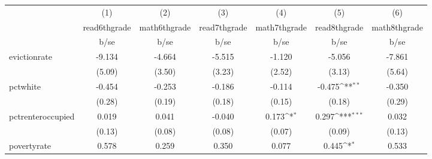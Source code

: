 {
\def\sym#1{\ifmmode^{#1}\else\(^{#1}\)\fi}
\begin{tabular}{l*{6}{c}}
\hline\hline
            &\multicolumn{1}{c}{(1)}           &\multicolumn{1}{c}{(2)}           &\multicolumn{1}{c}{(3)}           &\multicolumn{1}{c}{(4)}           &\multicolumn{1}{c}{(5)}           &\multicolumn{1}{c}{(6)}           \\
            &\multicolumn{1}{c}{read6thgrade}  &\multicolumn{1}{c}{math6thgrade}  &\multicolumn{1}{c}{read7thgrade}  &\multicolumn{1}{c}{math7thgrade}  &\multicolumn{1}{c}{read8thgrade}  &\multicolumn{1}{c}{math8thgrade}  \\
            &                     b/se         &                     b/se         &                     b/se         &                     b/se         &                     b/se         &                     b/se         \\
\hline
evictionrate&                   -9.134         &                   -4.664         &                   -5.515         &                   -1.120         &                   -5.056         &                   -7.861         \\
            &                   (5.09)         &                   (3.50)         &                   (3.23)         &                   (2.52)         &                   (3.13)         &                   (5.64)         \\
pctwhite    &                   -0.454         &                   -0.253         &                   -0.186         &                   -0.114         &                   -0.475\sym{**} &                   -0.350         \\
            &                   (0.28)         &                   (0.19)         &                   (0.18)         &                   (0.15)         &                   (0.18)         &                   (0.29)         \\
pctrenteroccupied&                    0.019         &                    0.041         &                   -0.040         &                    0.173\sym{*}  &                    0.297\sym{***}&                    0.032         \\
            &                   (0.13)         &                   (0.08)         &                   (0.08)         &                   (0.07)         &                   (0.09)         &                   (0.13)         \\
povertyrate &                    0.578         &                    0.259         &                    0.350         &                    0.077         &                    0.445\sym{*}  &                    0.533         \\

\end{tabular}}
